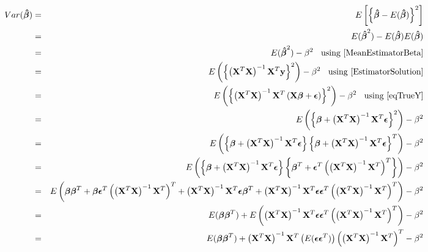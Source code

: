 \documentclass[11pt]{article}
\theoremstyle{remark}
\begin{document}
\begin{eqnarray}
Var(\boldsymbol{\hat{\beta}})&=& E\left[ \left\{  \boldsymbol{\hat{\beta}}-E(\boldsymbol{\hat{\beta}})  \right\}^2 \right]\nonumber\\
&=& E(\boldsymbol{\hat{\beta}}^2) - E(\boldsymbol{\hat{\beta}})E(\boldsymbol{\hat{\beta}})\nonumber\\
&=& E(\boldsymbol{\hat{\beta}}^2) - \beta^2\:\:\:\:\text{using \eqref{MeanEstimatorBeta}}\nonumber\\
&=& E\left(\left\{\left(\bold{X}^T\bold{X}\right)^{-1}\bold{X}^T\bold{y}\right\}^2\right) - \beta^2\:\:\:\:\text{using \eqref{EstimatorSolution}}\nonumber\\
&=& E\left(\left\{\left(\bold{X}^T\bold{X}\right)^{-1}\bold{X}^T\left(\bold{X}\boldsymbol{\beta} + \boldsymbol{\epsilon}\right)\right\}^2\right) - \beta^2\:\:\:\:\text{using \eqref{eqTrueY}}\nonumber\\
&=& E\left(\left\{\boldsymbol{\beta} + \left(\bold{X}^T\bold{X}\right)^{-1}\bold{X}^T\boldsymbol{\epsilon}\right\}^2\right) - \beta^2\nonumber\\
&=& E\left(\left\{\boldsymbol{\beta} + \left(\bold{X}^T\bold{X}\right)^{-1}\bold{X}^T\boldsymbol{\epsilon}\right\}\left\{\boldsymbol{\beta} + \left(\bold{X}^T\bold{X}\right)^{-1}\bold{X}^T\boldsymbol{\epsilon}\right\}^T\right) - \beta^2\nonumber\\
&=& E\left(\left\{\boldsymbol{\beta} + \left(\bold{X}^T\bold{X}\right)^{-1}\bold{X}^T\boldsymbol{\epsilon}\right\}\left\{\boldsymbol{\beta}^T + \boldsymbol{\epsilon}^T\left(\left(\bold{X}^T\bold{X}\right)^{-1}\bold{X}^T\right)^T\right\}\right) - \beta^2\nonumber\\
&=& E\left(\boldsymbol{\beta}\boldsymbol{\beta}^T  + \boldsymbol{\beta} \boldsymbol{\epsilon}^T\left(\left(\bold{X}^T\bold{X}\right)^{-1}\bold{X}^T\right)^T + \left(\bold{X}^T\bold{X}\right)^{-1}\bold{X}^T\boldsymbol{\epsilon}\boldsymbol{\beta}^T + \left(\bold{X}^T\bold{X}\right)^{-1}\bold{X}^T\boldsymbol{\epsilon}\boldsymbol{\epsilon}^T\left(\left(\bold{X}^T\bold{X}\right)^{-1}\bold{X}^T\right)^T\right)  - \beta^2\nonumber\\
&=& E(\boldsymbol{\beta}\boldsymbol{\beta}^T) + E\left(\left(\bold{X}^T\bold{X}\right)^{-1}\bold{X}^T\boldsymbol{\epsilon}\boldsymbol{\epsilon}^T\left(\left(\bold{X}^T\bold{X}\right)^{-1}\bold{X}^T\right)^T\right) - \beta^2\nonumber\\
&=& E(\boldsymbol{\beta}\boldsymbol{\beta}^T) + \left(\bold{X}^T\bold{X}\right)^{-1}\bold{X}^T\left(E(\boldsymbol{\epsilon}\boldsymbol{\epsilon}^T)\right)\left(\left(\bold{X}^T\bold{X}\right)^{-1}\bold{X}^T\right)^T - \beta^2\nonumber\\

\end{eqnarray}
\end{document}
